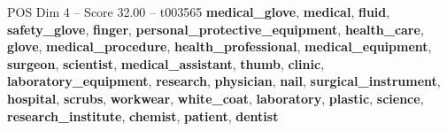 \begin{textsample}{POS Dim 4 – Score 32.00 – t003565}  \label{ex:f4_pos_005}
\textbf{medical\_glove}, \textbf{medical}, \textbf{fluid}, \textbf{safety\_glove}, \textbf{finger}, \textbf{personal\_protective\_equipment}, \textbf{health\_care}, \textbf{glove}, \textbf{medical\_procedure}, \textbf{health\_professional}, \textbf{medical\_equipment}, \textbf{surgeon}, \textbf{scientist}, \textbf{medical\_assistant}, \textbf{thumb}, \textbf{clinic}, \textbf{laboratory\_equipment}, \textbf{research}, \textbf{physician}, \textbf{nail}, \textbf{surgical\_instrument}, \textbf{hospital}, \textbf{scrubs}, \textbf{workwear}, \textbf{white\_coat}, \textbf{laboratory}, \textbf{plastic}, \textbf{science}, \textbf{research\_institute}, \textbf{chemist}, \textbf{patient}, \textbf{dentist}

\end{textsample}
